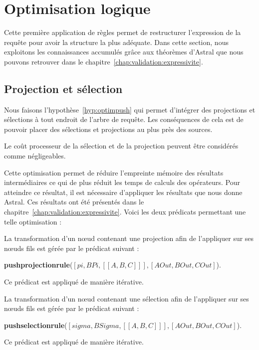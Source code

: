 \section{Optimisation logique}\label{sec:contrib:astronef:logique}
Cette première application de règles permet de restructurer l'expression de la requête pour avoir la structure la plus adéquate. Dans cette section, nous exploitons les connaissances accumulés grâce aux théorèmes d'Astral que nous pouvons retrouver dans le chapitre~\ref{chap:validation:expressivite}.

\subsection{Projection et sélection}
Nous faisons l'hypothèse~\ref{hyp:optimpush} qui permet d'intégrer des projections et sélections à tout endroit de l'arbre de requête. Les conséquences de cela est de pouvoir placer des sélections et projections au plus près des sources. 
\begin{hyp}\label{hyp:optimpush}
    Le coût processeur de la sélection et de la projection peuvent être considérés comme négligeables.
\end{hyp}
Cette optimisation permet de réduire l'empreinte mémoire des résultats intermédiaires ce qui de plus réduit les temps de calculs des opérateurs. Pour atteindre ce résultat, il est nécessaire d'appliquer les résultats que nous donne Astral. Ces résultats ont été présentés dans le chapitre~\ref{chap:validation:expressivite}. Voici les deux prédicats permettant une telle optimisation :
\begin{regle}
La transformation d'un nœud contenant une projection afin de l'appliquer sur ses nœuds fils est gérée par le prédicat suivant :
\begin{center} \textbf{pushprojectionrule}($[pi,BPi,[[A,B,C]]],[AOut,BOut,COut]$).\end{center}
Ce prédicat est appliqué de manière itérative.
\end{regle}
\begin{regle}
La transformation d'un nœud contenant une sélection afin de l'appliquer sur ses nœuds fils est gérée par le prédicat suivant :
\begin{center} \textbf{pushselectionrule}($[sigma,BSigma,[[A,B,C]]],[AOut,BOut,COut]$).\end{center}
Ce prédicat est appliqué de manière itérative.
\end{regle}

